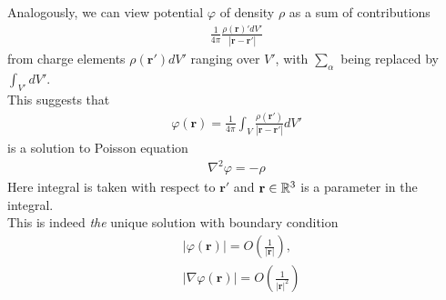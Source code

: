 \documentclass[a4paper]{article}
\begin{document}
Analogously, we can view potential $\varphi$ of density $\rho$ as a sum of contributions
\begin{equation*}
\begin{aligned}
\frac{1}{4\pi}\frac{\rho\left(\mathbf{r}\right)'dV'}{|\mathbf{r}-\mathbf{r}'|}
\end{aligned}
\end{equation*}
from charge elements $\rho\left(\mathbf{r}'\right)dV'$ ranging over $V'$, with $\sum_\alpha$ being replaced by $\int_{V'} dV'$.\\
This suggests that
\begin{equation*}
\begin{aligned}
\varphi\left(\mathbf{r}\right) = \frac{1}{4\pi} \int_V \frac{\rho\left(\mathbf{r}'\right)}{|\mathbf{r}-\mathbf{r}'|}dV'
\end{aligned}
\end{equation*}
is a solution to Poisson equation
\begin{equation*}
\begin{aligned}
\nabla^2\varphi = -\rho
\end{aligned}
\end{equation*}
Here integral is taken with respect to $\mathbf{r}'$ and $\mathbf{r}\in\mathbb{R}^3$ is a parameter in the integral.\\
This is indeed \emph{the} unique solution with boundary condition
\begin{equation*}
\begin{aligned}
&|\varphi\left(\mathbf{r}\right)| = O\left(\frac{1}{|\mathbf{r}|}\right),\\
&|\nabla\varphi\left(\mathbf{r}\right)| = O\left(\frac{1}{|\mathbf{r}|^2}\right)
\end{aligned}
\end{equation*}
\end{document}
